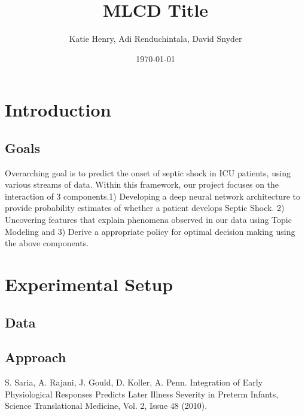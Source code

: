 \documentclass[dvips,12pt]{article}
\begin{document}

\title{MLCD Title}
\author{Katie Henry, Adi Renduchintala, David Snyder}
\date{\today}



\maketitle


\section{Introduction}


\subsection{Goals}
Overarching goal is to predict the onset of septic shock in ICU patients, using various streams of data. Within this framework, our project focuses on the interaction of 3 components.1) Developing a deep neural network architecture to provide probability estimates of whether a patient develops Septic Shock. 2) Uncovering features that explain phenomena observed in our data  using Topic Modeling and 3) Derive a appropriate policy for optimal decision making using the above  components.


\section{Experimental Setup}

\subsection{Data}

\subsection{Approach}



 
\begin{thebibliography}{99}
 S. Saria, 
A. Rajani, 
J. Gould, 
D. Koller, 
A. Penn. 
{Integration of Early Physiological Responses Predicts Later Illness Severity in Preterm Infants},
Science Translational Medicine, Vol. 2, Issue 48 (2010).

\end{thebibliography}
\end{document}
